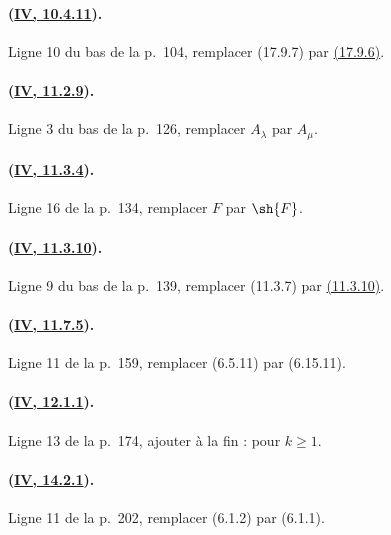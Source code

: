 \paragraph{({\texorpdfstring{\protect\hyperref[canon-index.ega4.c04.statement.10-4-11]{IV, 10.4.11}}{IV, 10.4.11}}).}
Ligne 10 du bas de la p.~104, remplacer (17.9.7) par
{\hyperlink{ega4.c04.prop.17-9-6}{(17.9.6)}}.

\paragraph{({\texorpdfstring{\protect\hyperref[canon-index.ega4.c04.thm.11-2-9]{IV, 11.2.9}}{IV, 11.2.9}}).}
Ligne 3 du bas de la p.~126, remplacer $A_\lambda$ par $A_\mu$.

\paragraph{({\texorpdfstring{\protect\hyperref[canon-index.ega4.c04.prop.11-3-4]{IV, 11.3.4}}{IV, 11.3.4}}).}
Ligne 16 de la p.~134, remplacer $F$ par $\sh{F}$.

\paragraph{({\texorpdfstring{\protect\hyperref[canon-index.ega4.c04.thm.11-3-10]{IV, 11.3.10}}{IV, 11.3.10}}).}
Ligne 9 du bas de la p.~139, remplacer (11.3.7) par
{\hyperref[canon-index.ega4.c04.thm.11-3-10]{(11.3.10)}}.

\paragraph{({\texorpdfstring{\protect\hyperref[canon-index.ega4.c04.statement.11-7-5]{IV, 11.7.5}}{IV, 11.7.5}}).}
Ligne 11 de la p.~159, remplacer (6.5.11) par (6.15.11).

\paragraph{({\texorpdfstring{\protect\hyperref[canon-index.ega4.c04.thm.12-1-1]{IV, 12.1.1}}{IV, 12.1.1}}).}
Ligne 13 de la p.~174, ajouter à la fin : pour $k\geq1$.

\paragraph{({\texorpdfstring{\protect\hyperref[canon-index.ega4.c04.thm.14-2-1]{IV, 14.2.1}}{IV, 14.2.1}}).}
Ligne 11 de la p.~202, remplacer (6.1.2) par (6.1.1).

